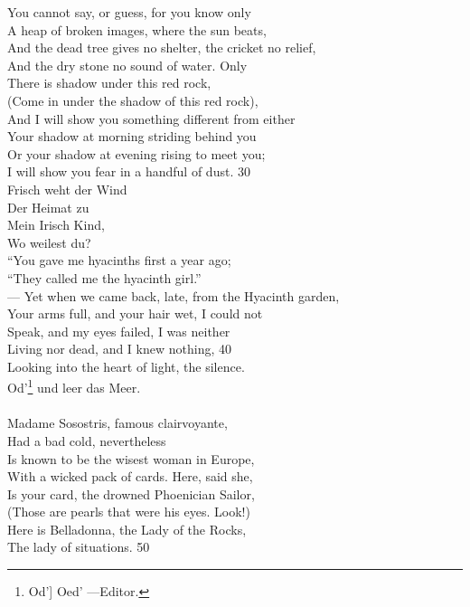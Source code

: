 \documentclass{article}
\begin{document}
You cannot say, or guess, for you know only \\
A heap of broken images, where the sun beats, \\
And the dead tree gives no shelter, the cricket no relief, \\
And the dry stone no sound of water. Only \\
There is shadow under this red rock, \\
(Come in under the shadow of this red rock), \\
And I will show you something different from either \\
Your shadow at morning striding behind you \\
Or your shadow at evening rising to meet you; \\
I will show you fear in a handful of dust.                        \hfill 30 \\
\indent     Frisch weht der Wind \\
\indent     Der Heimat zu \\
\indent     Mein Irisch Kind, \\
\indent     Wo weilest du? \\
``You gave me hyacinths first a year ago; \\
``They called me the hyacinth girl.'' \\
--- Yet when we came back, late, from the Hyacinth garden, \\
Your arms full, and your hair wet, I could not \\
Speak, and my eyes failed, I was neither \\
Living nor dead, and I knew nothing,                              \hfill 40 \\
Looking into the heart of light, the silence. \\
Od'\footnote{Od'] Oed' ---Editor.} und leer das Meer. \\
 \\
Madame Sosostris, famous clairvoyante, \\
Had a bad cold, nevertheless \\
Is known to be the wisest woman in Europe, \\
With a wicked pack of cards. Here, said she, \\
Is your card, the drowned Phoenician Sailor, \\
(Those are pearls that were his eyes. Look!) \\
Here is Belladonna, the Lady of the Rocks, \\
The lady of situations.                                           \hfill 50 \\
\end{document}
